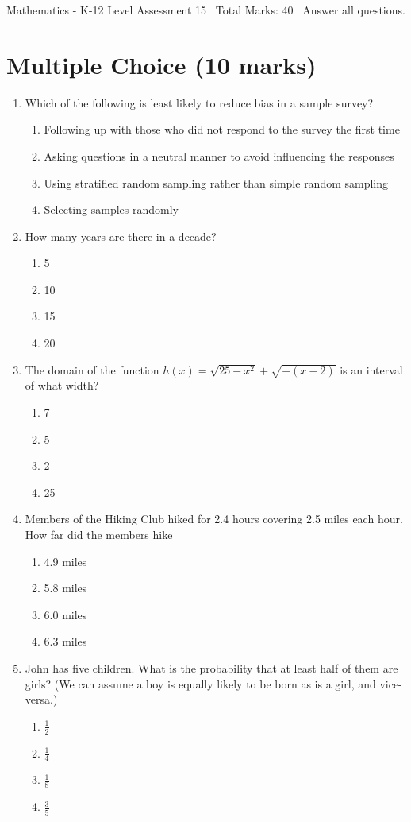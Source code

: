 \documentclass[12pt]{article}
\begin{document}
\begin{center}
Mathematics - K-12 Level Assessment 15 \
Total Marks: 40 \
Answer all questions.
\end{center}

\section*{Multiple Choice (10 marks)}
\begin{enumerate}[label=\arabic*.]
\item Which of the following is least likely to reduce bias in a sample survey?
\begin{enumerate}[label=(\alph*)]
    \item Following up with those who did not respond to the survey the first time
    \item Asking questions in a neutral manner to avoid influencing the responses
    \item Using stratified random sampling rather than simple random sampling
    \item Selecting samples randomly
\end{enumerate}
\item How many years are there in a decade?
\begin{enumerate}[label=(\alph*)]
    \item 5
    \item 10
    \item 15
    \item 20
\end{enumerate}
\item The domain of the function $h(x) = \sqrt{25-x^2}+\sqrt{-(x-2)}$ is an interval of what width?
\begin{enumerate}[label=(\alph*)]
    \item 7
    \item 5
    \item 2
    \item 25
\end{enumerate}
\item Members of the Hiking Club hiked for 2.4 hours covering 2.5 miles each hour. How far did the members hike
\begin{enumerate}[label=(\alph*)]
    \item 4.9 miles
    \item 5.8 miles
    \item 6.0 miles
    \item 6.3 miles
\end{enumerate}
\item John has five children. What is the probability that at least half of them are girls? (We can assume a boy is equally likely to be born as is a girl, and vice-versa.)
\begin{enumerate}[label=(\alph*)]
    \item \ensuremath{\frac{1}{2}}
    \item \ensuremath{\frac{1}{4}}
    \item \ensuremath{\frac{1}{8}}
    \item \ensuremath{\frac{3}{5}}
\end{enumerate}
\end{enumerate}
\end{document}
